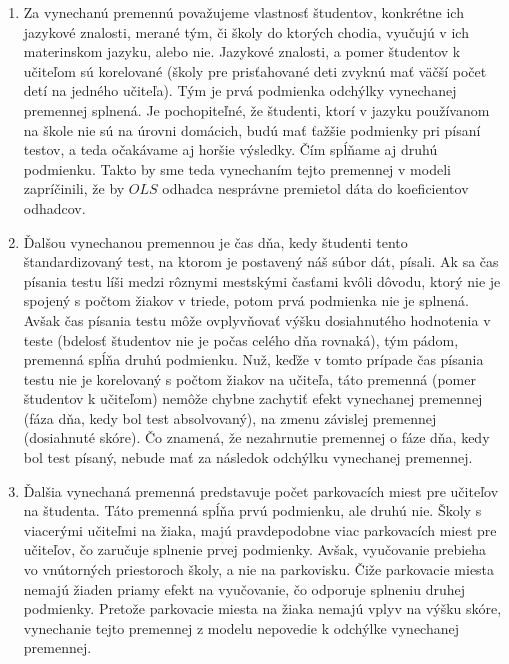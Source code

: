 \documentclass[]{tukediphc}
\begin{document}
\begin{enumerate}
\item Za vynechanú premennú považujeme vlastnosť študentov, konkrétne ich jazykové znalosti, merané tým, či školy do ktorých chodia, vyučujú v ich materinskom jazyku, alebo nie. Jazykové znalosti, a pomer študentov k učiteľom sú korelované (školy pre prisťahované deti zvyknú mať väčší počet detí na jedného učiteľa). Tým je prvá podmienka odchýlky vynechanej premennej splnená. Je pochopiteľné, že študenti, ktorí v jazyku používanom na škole nie sú na úrovni domácich, budú mať ťažšie podmienky pri písaní testov, a teda očakávame aj horšie výsledky. Čím spĺňame aj druhú podmienku. Takto by sme teda vynechaním tejto premennej v modeli zapríčinili, že by $OLS$ odhadca nesprávne premietol dáta do koeficientov odhadcov.
\item Ďalšou vynechanou premennou je čas dňa, kedy študenti tento štandardizovaný test, na ktorom je postavený náš súbor dát, písali. Ak sa čas písania testu líši medzi rôznymi mestskými časťami kvôli dôvodu, ktorý nie je spojený s počtom žiakov v triede, potom prvá podmienka nie je splnená. Avšak čas písania testu môže ovplyvňovať výšku dosiahnutého hodnotenia v teste (bdelosť študentov nie je počas celého dňa rovnaká), tým pádom, premenná spĺňa druhú podmienku. Nuž, keďže v tomto prípade čas písania testu nie je korelovaný s počtom žiakov na učiteľa, táto premenná (pomer študentov k učiteľom) nemôže chybne zachytiť efekt vynechanej premennej (fáza dňa, kedy bol test absolvovaný), na zmenu závislej premennej (dosiahnuté skóre). Čo znamená, že nezahrnutie premennej o fáze dňa, kedy bol test písaný, nebude mať za následok odchýlku vynechanej premennej. 
\item Ďalšia vynechaná premenná predstavuje počet parkovacích miest pre učiteľov na študenta. Táto premenná spĺňa prvú podmienku, ale druhú nie. Školy s viacerými učiteľmi na žiaka, majú pravdepodobne viac parkovacích miest pre učiteľov, čo zaručuje splnenie prvej podmienky. Avšak, vyučovanie prebieha vo vnútorných priestoroch školy, a nie na parkovisku. Čiže parkovacie miesta nemajú žiaden priamy efekt na vyučovanie, čo odporuje splneniu druhej podmienky. Pretože parkovacie miesta na žiaka nemajú vplyv na výšku skóre, vynechanie tejto premennej z modelu nepovedie k odchýlke vynechanej premennej.
\end{enumerate}
\end{document}
